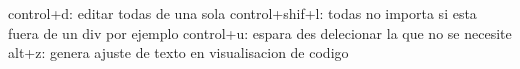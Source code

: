 control+d: editar todas de una sola
control+shif+l: todas no importa si esta fuera de un div por ejemplo
control+u: espara des delecionar la que no se necesite
alt+z: genera ajuste de texto en visualisacion de codigo
